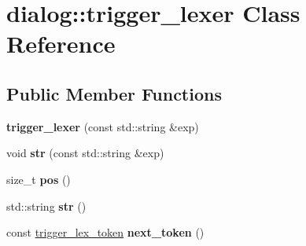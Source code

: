 \hypertarget{classdialog_1_1trigger__lexer}{}\section{dialog\+:\+:trigger\+\_\+lexer Class Reference}
\label{classdialog_1_1trigger__lexer}
\subsection*{Public Member Functions}
\begin{DoxyCompactItemize}
\item 
\mbox{\label{classdialog_1_1trigger__lexer_a0a7a49b605d1e400e9b9413539bfb91b}} 
{\bfseries trigger\+\_\+lexer} (const std\+::string \&exp)
\item 
\mbox{\label{classdialog_1_1trigger__lexer_ab0220d33b6e19dd7f2c6be53938faabf}} 
void {\bfseries str} (const std\+::string \&exp)
\item 
\mbox{\label{classdialog_1_1trigger__lexer_a2b11ed854a1e3e6c51c82928c9aac9e9}} 
size\+\_\+t {\bfseries pos} ()
\item 
\mbox{\label{classdialog_1_1trigger__lexer_aeaaa5db0c6cd2b92aafca26c392d7048}} 
std\+::string {\bfseries str} ()
\item 
\mbox{\label{classdialog_1_1trigger__lexer_a233e41048c686663994494bacdf26881}} 
const \hyperlink{structdialog_1_1trigger__lex__token}{trigger\+\_\+lex\+\_\+token} {\bfseries next\+\_\+token} ()
\end{DoxyCompactItemize}
